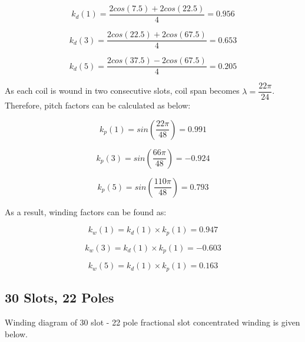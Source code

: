 \documentclass{reportClass}
\begin{document}
\begin{equation*}
    k_d(1) = \dfrac{2cos(7.5)+2cos(22.5)}{4} = 0.956
\end{equation*}

\begin{equation*}
    k_d(3) = \dfrac{2cos(22.5)+2cos(67.5)}{4} = 0.653
\end{equation*}

\begin{equation*}
    k_d(5) = \dfrac{2cos(37.5)-2cos(67.5)}{4} = 0.205
\end{equation*}

As each coil is wound in two consecutive slots, coil span becomes $\lambda = \dfrac{22\pi}{24}$. Therefore, pitch factors can be calculated as below:

\begin{equation*}
    k_p(1) = sin(\dfrac{22\pi}{48}) = 0.991
\end{equation*}

\begin{equation*}
    k_p(3) = sin(\dfrac{66\pi}{48}) = -0.924
\end{equation*}

\begin{equation*}
    k_p(5) = sin(\dfrac{110\pi}{48}) = 0.793
\end{equation*}


As a result, winding factors can be found as:

\begin{equation*}
    k_w(1) = k_d(1)\times k_p(1) = 0.947
\end{equation*}

\begin{equation*}
    k_w(3) =  k_d(1)\times k_p(1) = -0.603
\end{equation*}

\begin{equation*}
    k_w(5) =  k_d(1)\times k_p(1) = 0.163
\end{equation*}

\subsection{30 Slots, 22 Poles}



Winding diagram of 30 slot - 22 pole fractional slot concentrated winding is given below.
\end{document}
